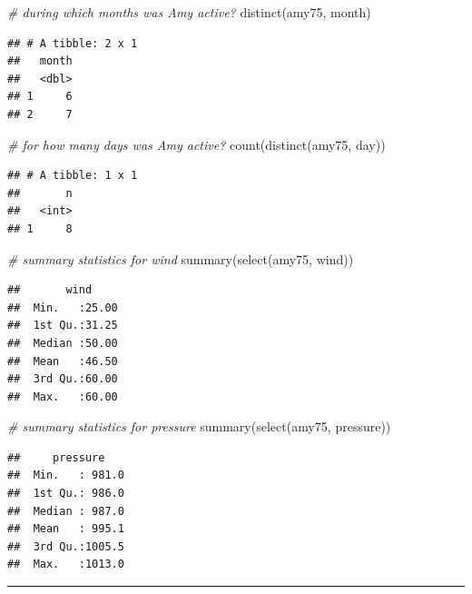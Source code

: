 \documentclass[
]{book}
\newenvironment{Shaded}{\begin{snugshade}}{\end{snugshade}}
\newcommand{\CommentTok}[1]{\textcolor[rgb]{0.56,0.35,0.01}{\textit{#1}}}
\newcommand{\FunctionTok}[1]{\textcolor[rgb]{0.00,0.00,0.00}{#1}}
\newcommand{\NormalTok}[1]{#1}
\begin{document}
\begin{Shaded}
\begin{Highlighting}[]
\CommentTok{\# during which months was Amy active?}
\FunctionTok{distinct}\NormalTok{(amy75, month)}
\end{Highlighting}
\end{Shaded}

\begin{verbatim}
## # A tibble: 2 x 1
##   month
##   <dbl>
## 1     6
## 2     7
\end{verbatim}

\begin{Shaded}
\begin{Highlighting}[]
\CommentTok{\# for how many days was Amy active?}
\FunctionTok{count}\NormalTok{(}\FunctionTok{distinct}\NormalTok{(amy75, day))}
\end{Highlighting}
\end{Shaded}

\begin{verbatim}
## # A tibble: 1 x 1
##       n
##   <int>
## 1     8
\end{verbatim}

\begin{Shaded}
\begin{Highlighting}[]
\CommentTok{\# summary statistics for wind}
\FunctionTok{summary}\NormalTok{(}\FunctionTok{select}\NormalTok{(amy75, wind))}
\end{Highlighting}
\end{Shaded}

\begin{verbatim}
##       wind      
##  Min.   :25.00  
##  1st Qu.:31.25  
##  Median :50.00  
##  Mean   :46.50  
##  3rd Qu.:60.00  
##  Max.   :60.00
\end{verbatim}

\begin{Shaded}
\begin{Highlighting}[]
\CommentTok{\# summary statistics for pressure}
\FunctionTok{summary}\NormalTok{(}\FunctionTok{select}\NormalTok{(amy75, pressure))}
\end{Highlighting}
\end{Shaded}

\begin{verbatim}
##     pressure     
##  Min.   : 981.0  
##  1st Qu.: 986.0  
##  Median : 987.0  
##  Mean   : 995.1  
##  3rd Qu.:1005.5  
##  Max.   :1013.0
\end{verbatim}

\begin{center}\rule{0.5\linewidth}{0.5pt}\end{center}
\end{document}
